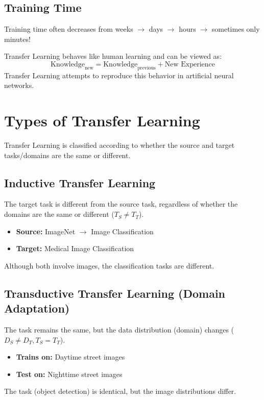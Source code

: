 \subsection{Training Time}
Training time often decreases from weeks $\to$ days $\to$ hours $\to$ sometimes only minutes!

\begin{propertybox}
Transfer Learning behaves like human learning and can be viewed as:
\begin{equation}
\text{Knowledge}_{\text{new}} = \text{Knowledge}_{\text{previous}} + \text{New Experience}
\end{equation}
Transfer Learning attempts to reproduce this behavior in artificial neural networks.
\end{propertybox}

\section{Types of Transfer Learning}

Transfer Learning is classified according to whether the source and target tasks/domains are the same or different.

\subsection{Inductive Transfer Learning}
The target task is different from the source task, regardless of whether the domains are the same or different ($T_S \neq T_T$).
\begin{itemize}
    \item \textbf{Source:} ImageNet $\to$ Image Classification
    \item \textbf{Target:} Medical Image Classification
\end{itemize}
Although both involve images, the classification tasks are different.

\subsection{Transductive Transfer Learning (Domain Adaptation)}
The task remains the same, but the data distribution (domain) changes ($D_S \neq D_T, T_S = T_T$).
\begin{itemize}
    \item \textbf{Trains on:} Daytime street images
    \item \textbf{Test on:} Nighttime street images
\end{itemize}
The task (object detection) is identical, but the image distributions differ.

